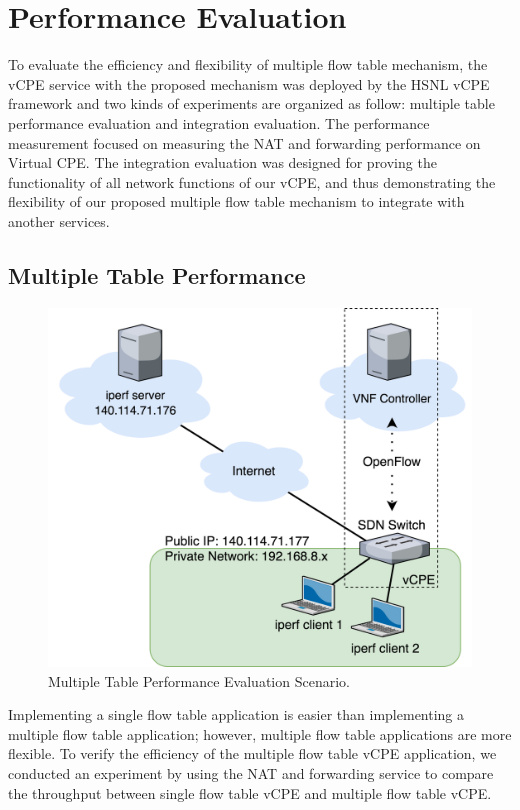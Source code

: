 \chapter{Performance Evaluation} \label{ch:evaluation}

To evaluate the efficiency and flexibility of multiple flow table mechanism, the vCPE service with the proposed mechanism was deployed by the HSNL vCPE framework and two kinds of experiments are organized as follow: multiple table performance evaluation and integration evaluation.
The performance measurement focused on measuring the NAT and forwarding performance on Virtual CPE.
The integration evaluation was designed for proving the functionality of all network functions of our vCPE, and thus demonstrating the flexibility of our proposed multiple flow table mechanism to integrate with another services.

\section{Multiple Table Performance}

\begin{figure}[!t]
\centering
\includegraphics[width=\textwidth]{./fig/throughput_measurement_scenario.png}
\caption{Multiple Table Performance Evaluation Scenario.}
\label{fig:throughput_measurement_scenario}
\end{figure}

Implementing a single flow table application is easier than implementing a multiple flow table application; however, multiple flow table applications are more flexible.
To verify the efficiency of the multiple flow table vCPE application, we conducted an experiment by using the NAT and forwarding service to compare the throughput between single flow table vCPE and multiple flow table vCPE.

